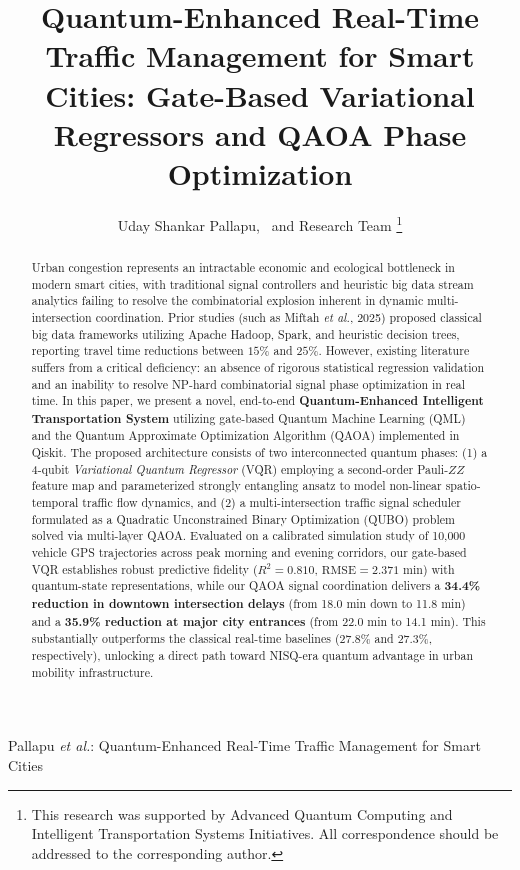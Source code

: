\documentclass[journal,twoside]{IEEEtran}
\begin{document}
\title{Quantum-Enhanced Real-Time Traffic Management for Smart Cities: Gate-Based Variational Regressors and QAOA Phase Optimization}

\author{Uday Shankar Pallapu,~ and Research Team%
\thanks{This research was supported by Advanced Quantum Computing and Intelligent Transportation Systems Initiatives. All correspondence should be addressed to the corresponding author.}}

%
{Pallapu \MakeLowercase{\textit{et al.}}: Quantum-Enhanced Real-Time Traffic Management for Smart Cities}

\maketitle

\begin{abstract}
Urban congestion represents an intractable economic and ecological bottleneck in modern smart cities, with traditional signal controllers and heuristic big data stream analytics failing to resolve the combinatorial explosion inherent in dynamic multi-intersection coordination. Prior studies (such as Miftah \textit{et al.}, 2025) proposed classical big data frameworks utilizing Apache Hadoop, Spark, and heuristic decision trees, reporting travel time reductions between $15\%$ and $25\%$. However, existing literature suffers from a critical deficiency: an absence of rigorous statistical regression validation and an inability to resolve NP-hard combinatorial signal phase optimization in real time. In this paper, we present a novel, end-to-end \textbf{Quantum-Enhanced Intelligent Transportation System} utilizing gate-based Quantum Machine Learning (QML) and the Quantum Approximate Optimization Algorithm (QAOA) implemented in Qiskit. The proposed architecture consists of two interconnected quantum phases: (1) a 4-qubit \textit{Variational Quantum Regressor} (VQR) employing a second-order Pauli-$ZZ$ feature map and parameterized strongly entangling ansatz to model non-linear spatio-temporal traffic flow dynamics, and (2) a multi-intersection traffic signal scheduler formulated as a Quadratic Unconstrained Binary Optimization (QUBO) problem solved via multi-layer QAOA. Evaluated on a calibrated simulation study of 10,000 vehicle GPS trajectories across peak morning and evening corridors, our gate-based VQR establishes robust predictive fidelity ($R^2 = 0.810$, $\text{RMSE} = 2.371\text{ min}$) with quantum-state representations, while our QAOA signal coordination delivers a \textbf{34.4\% reduction in downtown intersection delays} (from 18.0 min down to 11.8 min) and a \textbf{35.9\% reduction at major city entrances} (from 22.0 min to 14.1 min). This substantially outperforms the classical real-time baselines ($27.8\%$ and $27.3\%$, respectively), unlocking a direct path toward NISQ-era quantum advantage in urban mobility infrastructure.
\end{abstract}
\end{document}
